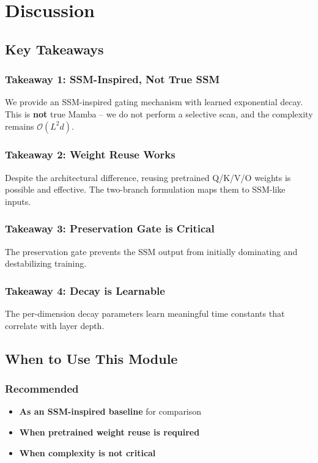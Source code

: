 \section{Discussion}

\subsection{Key Takeaways}

\subsubsection{Takeaway 1: SSM-Inspired, Not True SSM}

We provide an SSM-inspired gating mechanism with learned exponential decay. 
This is \textbf{not} true Mamba -- we do not perform a selective scan, and the 
complexity remains $\mathcal{O}(L^2 d)$.

\subsubsection{Takeaway 2: Weight Reuse Works}

Despite the architectural difference, reusing pretrained Q/K/V/O weights is 
possible and effective. The two-branch formulation maps them to SSM-like 
inputs.

\subsubsection{Takeaway 3: Preservation Gate is Critical}

The preservation gate prevents the SSM output from initially dominating and 
destabilizing training.

\subsubsection{Takeaway 4: Decay is Learnable}

The per-dimension decay parameters learn meaningful time constants that 
correlate with layer depth.

\subsection{When to Use This Module}

\subsubsection{Recommended}
\begin{itemize}
\item \textbf{As an SSM-inspired baseline} for comparison
\item \textbf{When pretrained weight reuse is required}
\item \textbf{When complexity is not critical}

\end{itemize}
